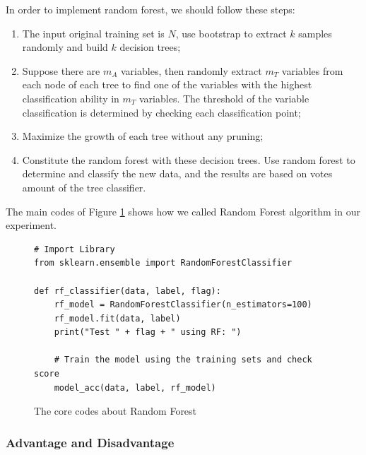 \documentclass[sigconf]{acmart}
\begin{document}
In order to implement random forest, we should follow these steps:
\begin{enumerate}
    \item The input original training set is $N$, use bootstrap to extract $k$ samples randomly and build $k$ decision trees;
    \item Suppose there are $m_{A}$ variables, then randomly extract $m_{T}$ variables from each node of each tree to find one of the variables with the highest classification ability in $m_{T}$ variables. The threshold of the variable classification is determined by checking each classification point;
    \item Maximize the growth of each tree without any pruning;
    \item Constitute the random forest with these decision trees. Use random forest to determine and classify the new data, and the results are based on votes amount of the tree classifier.
\end{enumerate}

The main codes of Figure \ref{fig:rf} shows how we called Random Forest algorithm in our experiment.

\begin{figure}[htb]
\centering
\begin{lstlisting}
# Import Library
from sklearn.ensemble import RandomForestClassifier

def rf_classifier(data, label, flag):
    rf_model = RandomForestClassifier(n_estimators=100)
    rf_model.fit(data, label)
    print("Test " + flag + " using RF: ")
    
    # Train the model using the training sets and check score
    model_acc(data, label, rf_model)
\end{lstlisting}
\caption{The core codes about Random Forest}\label{fig:rf}
\end{figure}

\subsubsection{Advantage and Disadvantage}
\end{document}
